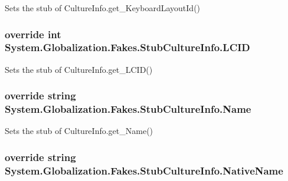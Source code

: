 Sets the stub of Culture\-Info.\-get\-\_\-\-Keyboard\-Layout\-Id()

\hypertarget{class_system_1_1_globalization_1_1_fakes_1_1_stub_culture_info_a61eef5bda2b932a11aa7154e59acd36b}{
\subsubsection[{L\-C\-I\-D}]{\setlength{\rightskip}{0pt plus 5cm}override int System.\-Globalization.\-Fakes.\-Stub\-Culture\-Info.\-L\-C\-I\-D\hspace{0.3cm}{\ttfamily [get]}}}\label{class_system_1_1_globalization_1_1_fakes_1_1_stub_culture_info_a61eef5bda2b932a11aa7154e59acd36b}


Sets the stub of Culture\-Info.\-get\-\_\-\-L\-C\-I\-D()

\hypertarget{class_system_1_1_globalization_1_1_fakes_1_1_stub_culture_info_a7484ca1485c94ee3f69e36cc43ad53f1}{
\subsubsection[{Name}]{\setlength{\rightskip}{0pt plus 5cm}override string System.\-Globalization.\-Fakes.\-Stub\-Culture\-Info.\-Name\hspace{0.3cm}{\ttfamily [get]}}}\label{class_system_1_1_globalization_1_1_fakes_1_1_stub_culture_info_a7484ca1485c94ee3f69e36cc43ad53f1}


Sets the stub of Culture\-Info.\-get\-\_\-\-Name()

\hypertarget{class_system_1_1_globalization_1_1_fakes_1_1_stub_culture_info_aee01bafbc982a0fd5cad5d8d140f66c5}{
\subsubsection[{Native\-Name}]{\setlength{\rightskip}{0pt plus 5cm}override string System.\-Globalization.\-Fakes.\-Stub\-Culture\-Info.\-Native\-Name\hspace{0.3cm}{\ttfamily [get]}}}\label{class_system_1_1_globalization_1_1_fakes_1_1_stub_culture_info_aee01bafbc982a0fd5cad5d8d140f66c5}


